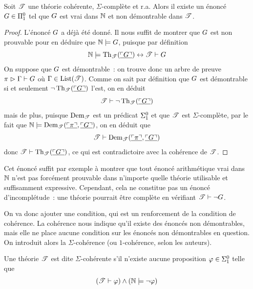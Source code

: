 \begin{theorem}
  Soit $\mathscr T$ une théorie cohérente, $\Sigma$-complète et r.a. Alors il
  existe un énoncé $G \in \Pi^0_{1}$ tel que $G$ est vrai dans
  $\mathbb N$ et non démontrable dans $\mathscr T$.
\end{theorem}

\begin{proof}
  L'énoncé $G$ a déjà été donné. Il nous suffit de montrer que $G$ est
  non prouvable pour en déduire que $\mathbb N \models G$, puisque par définition
  \[\mathbb N \models \operatorname{Th}_{\mathscr T}(\underline{\ulcorner G\urcorner}) \mathrel{\leftrightarrow} \mathscr T \vdash G\]
  On suppose que $G$ est démontrable~: on trouve donc un arbre de preuve
  $\pi\mathrel{\rhd} \Gamma \vdash G$ où $\Gamma \in\operatorname{List}(\mathscr T)$.
  Comme on sait par définition que $G$ est démontrable si et seulement
  $\lnot\operatorname{Th}_{\mathscr T}(\underline{\ulcorner G\urcorner})$ l'est, on en déduit
  \[\mathscr T \vdash \lnot\operatorname{Th}_{\mathscr T}(\underline{\ulcorner G\urcorner})\]
  mais de plus, puisque $\operatorname{Dem}_{\mathscr T}$ est un prédicat $\Sigma^0_{1}$ et
  que $\mathscr T$ est $\Sigma$-complète, par le fait que
  $\mathbb N\models \operatorname{Dem}_{\mathscr T}(\underline{\ulcorner\pi\urcorner},\underline{\ulcorner G\urcorner})$,
  on en déduit que
  \[\mathscr T \vdash \operatorname{Dem}_{\mathscr T}
  (\underline{\ulcorner\pi\urcorner},\underline{\ulcorner G\urcorner})\]
  donc $\mathscr T \vdash \operatorname{Th}_{\mathscr T}(\underline{\ulcorner G\urcorner})$, ce qui est
  contradictoire avec la cohérence de $\mathscr T$.
\end{proof}

Cet énoncé suffit par exemple à montrer que tout énoncé arithmétique vrai dans
$\mathbb N$ n'est pas forcément prouvable dans n'importe quelle théorie utilisable et
suffisamment expressive. Cependant, cela ne constitue pas un énoncé
d'incomplétude~: une théorie pourrait être complète en vérifiant
$\mathscr T \vdash \lnot G$.

On va donc ajouter une condition, qui est un renforcement de la condition de
cohérence. La cohérence nous indique qu'il existe des énoncés non démontrables,
mais elle ne place aucune condition sur les énoncés non démontrables en
question. On introduit alors la $\Sigma$-cohérence (ou $1$-cohérence, selon les
auteurs).

\begin{definition}
  Une théorie $\mathscr T$ est dite $\Sigma$-cohérente s'il n'existe aucune
  proposition $\varphi \in \Sigma^0_{1}$ telle que
  \[(\mathscr T \vdash \varphi) \land (\mathbb N \models \lnot\varphi)\]
\end{definition}

